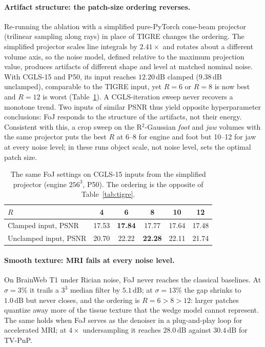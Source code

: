 \documentclass[11pt]{article}
\newcommand{\dB}{\,\mathrm{dB}}
\begin{document}
\paragraph{Artifact structure: the patch-size ordering reverses.}
Re-running the ablation with a simplified pure-PyTorch cone-beam
projector (trilinear sampling along rays) in place of TIGRE changes the
ordering. The simplified projector scales line integrals by $2.41\times$
and rotates about a different volume axis, so the noise model, defined
relative to the maximum projection value, produces artifacts of
different shape and level at matched nominal noise. With CGLS-15 and
P50, its input reaches $12.20\dB$ clamped ($9.38\dB$ unclamped),
comparable to the TIGRE input, yet $R{=}6$ or $R{=}8$ is now best and
$R{=}12$ is worst (Table~\ref{tab:inhouse}). A CGLS-iteration sweep
never recovers a monotone trend. Two inputs of similar PSNR thus yield
opposite hyperparameter conclusions: FoJ responds to the structure of
the artifacts, not their energy. Consistent with this, a crop sweep on
the R$^2$-Gaussian \emph{foot} and \emph{jaw} volumes with the same
projector puts the best $R$ at 6--8 for engine and foot but 10--12 for
jaw at every noise level; in these runs object scale, not noise level,
sets the optimal patch size.

\begin{table}[t]
\centering
\caption{The same FoJ settings on CGLS-15 inputs from the simplified
projector (engine $256^3$, P50). The ordering is the opposite of
Table~\ref{tab:tigre}.}
\label{tab:inhouse}
\begin{tabular}{lccccc}
\toprule
$R$ & 4 & 6 & 8 & 10 & 12 \\
\midrule
Clamped input, PSNR   & 17.53 & \textbf{17.84} & 17.77 & 17.64 & 17.48 \\
Unclamped input, PSNR & 20.70 & 22.22 & \textbf{22.28} & 22.11 & 21.74 \\
\bottomrule
\end{tabular}
\end{table}

\paragraph{Smooth texture: MRI fails at every noise level.}
On BrainWeb T1 under Rician noise, FoJ never reaches the classical
baselines. At $\sigma{=}3\%$ it trails a $3^3$ median filter by $5.1\dB$;
at $\sigma{=}13\%$ the gap shrinks to $1.0\dB$ but never closes, and the
ordering is $R{=}6>8>12$: larger patches quantize away more of the
tissue texture that the wedge model cannot represent. The same holds
when FoJ serves as the denoiser in a plug-and-play loop for accelerated
MRI; at $4\times$ undersampling it reaches $28.0\dB$ against $30.4\dB$
for TV-PnP.
\end{document}
